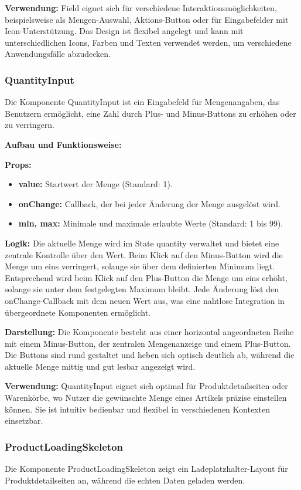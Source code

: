 \noindent\textbf{Verwendung:} Field eignet sich für verschiedene Interaktionsmöglichkeiten, beispielsweise als Mengen-Auswahl, Aktions-Button oder für Eingabefelder mit Icon-Unterstützung. Das Design ist flexibel angelegt und kann mit unterschiedlichen Icons, Farben und Texten verwendet werden, um verschiedene Anwendungsfälle abzudecken.

\subsubsection{QuantityInput}
Die Komponente QuantityInput ist ein Eingabefeld für Mengenangaben, das Benutzern ermöglicht, eine Zahl durch Plus- und Minus-Buttons zu erhöhen oder zu verringern.

\noindent\textbf{Aufbau und Funktionsweise:}

\textbf{Props:}
\begin{itemize}
    \item \textbf{value:} Startwert der Menge (Standard: 1).
    \item \textbf{onChange:} Callback, der bei jeder Änderung der Menge ausgelöst wird.
    \item \textbf{min, max:} Minimale und maximale erlaubte Werte (Standard: 1 bis 99).
\end{itemize}

\textbf{Logik:}
Die aktuelle Menge wird im State quantity verwaltet und bietet eine zentrale Kontrolle über den Wert. Beim Klick auf den Minus-Button wird die Menge um eins verringert, solange sie über dem definierten Minimum liegt. Entsprechend wird beim Klick auf den Plus-Button die Menge um eins erhöht, solange sie unter dem festgelegten Maximum bleibt. Jede Änderung löst den onChange-Callback mit dem neuen Wert aus, was eine nahtlose Integration in übergeordnete Komponenten ermöglicht.

\textbf{Darstellung:}
Die Komponente besteht aus einer horizontal angeordneten Reihe mit einem Minus-Button, der zentralen Mengenanzeige und einem Plus-Button. Die Buttons sind rund gestaltet und heben sich optisch deutlich ab, während die aktuelle Menge mittig und gut lesbar angezeigt wird.

\noindent\textbf{Verwendung:} QuantityInput eignet sich optimal für Produktdetailseiten oder Warenkörbe, wo Nutzer die gewünschte Menge eines Artikels präzise einstellen können. Sie ist intuitiv bedienbar und flexibel in verschiedenen Kontexten einsetzbar.

\subsubsection{ProductLoadingSkeleton}
Die Komponente ProductLoadingSkeleton zeigt ein Ladeplatzhalter-Layout für Produktdetailseiten an, während die echten Daten geladen werden.


